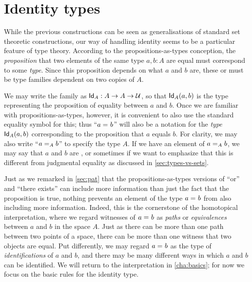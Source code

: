 %
%
%

\section{Identity types}
\label{sec:identity-types}

%
%
%
%
While the previous constructions can be seen as generalisations of
standard set theoretic constructions, our way of handling identity  seems to be
a particular feature of type theory.
According to the propositions-as-types conception, the \emph{proposition} that two elements of the same type $a,b:A$ are equal must correspond to some \emph{type}.
Since this proposition depends on what $a$ and $b$ are, these  or  must be type families dependent on two copies of $A$.

We may write the family as $\idtypevar{A}:A\to A\to\type$, so that $\idtype[A]ab$ is the type representing the proposition of equality between $a$ and $b$.
Once we are familiar with propositions-as-types, however, it is convenient to also use the standard equality symbol for this; thus ``$\id{a}{b}$'' will also be a notation for the \emph{type} $\idtype[A]ab$ corresponding to the proposition that $a$ equals $b$.
For clarity, we may also write ``$\id[A]{a}{b}$'' to specify the type $A$.
If we have an element of $\id[A]{a}{b}$, we may say that $a$ and $b$ are , or sometimes  if we want to emphasize that this is different from judgmental equality as discussed in \autoref{sec:types-vs-sets}.
%

Just as we remarked in \autoref{sec:pat} that the propositions-as-types versions of ``or'' and ``there exists'' can include more information than just the fact that the proposition is true, nothing prevents an element of the type $\id{a}{b}$ from also including more information.
Indeed, this is the cornerstone of the homotopical interpretation, where we regard witnesses of $\id{a}{b}$ as \emph{paths} or \emph{equivalences} between $a$ and $b$ in the space $A$.  Just as there can be more than one path between two points of a space, there can be more than one witness that two objects are equal.  Put differently, we may regard $\id{a}{b}$ as the type of \emph{identifications} of $a$ and $b$, and there may be many different ways in which $a$ and $b$ can be identified.
We will return to the interpretation in \autoref{cha:basics}; for now we focus on the basic rules for the identity type.

